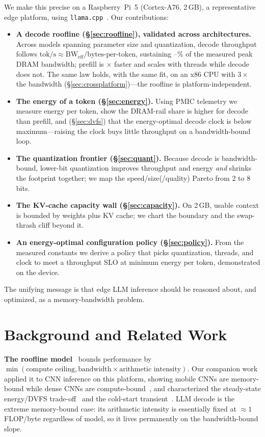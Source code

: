 \documentclass[10pt,journal,compsoc]{IEEEtran}
\newcommand{\tokps}{\text{tok/s}}
\begin{document}
We make this precise on a Raspberry~Pi~5 (Cortex-A76, 2\,GB), a representative edge platform, using
\texttt{llama.cpp}~\cite{llamacpp}. Our contributions:
\begin{itemize}
\item \textbf{A decode roofline (\S\ref{sec:roofline}), validated across architectures.} Across
models spanning parameter size and quantization, decode throughput follows
$\tokps\approx \mathrm{BW}_\text{eff}/\text{bytes-per-token}$, sustaining \DECBWLO--\DECBWHI\% of
the measured peak DRAM bandwidth; prefill is \PPTGRATIO$\times$ faster and scales with threads
while decode does not. The same law holds, with the same fit, on an x86 CPU with $3\times$ the
bandwidth (\S\ref{sec:crossplatform})---the roofline is platform-independent.
\item \textbf{The energy of a token (\S\ref{sec:energy}).} Using PMIC telemetry we measure energy
per token, show the DRAM-rail share is higher for decode than prefill, and (\S\ref{sec:dvfs}) that
the energy-optimal decode clock is below maximum---raising the clock buys little throughput on a
bandwidth-bound loop.
\item \textbf{The quantization frontier (\S\ref{sec:quant}).} Because decode is bandwidth-bound,
lower-bit quantization improves throughput and energy \emph{and} shrinks the footprint together;
we map the speed/size(/quality) Pareto from 2 to 8 bits.
\item \textbf{The KV-cache capacity wall (\S\ref{sec:capacity}).} On 2\,GB, usable context is
bounded by weights plus KV cache; we chart the boundary and the swap-thrash cliff beyond it.
\item \textbf{An energy-optimal configuration policy (\S\ref{sec:policy}).} From the measured
constants we derive a policy that picks quantization, threads, and clock to meet a throughput SLO
at minimum energy per token, demonstrated on the device.
\end{itemize}
The unifying message is that edge LLM inference should be reasoned about, and optimized, as a
memory-bandwidth problem.

\section{Background and Related Work}\label{sec:related}
\textbf{The roofline model}~\cite{williams2009roofline} bounds performance by
$\min(\text{compute ceiling}, \text{bandwidth}\times\text{arithmetic intensity})$. Our companion
work applied it to CNN inference on this platform, showing mobile CNNs are memory-bound while dense
CNNs are compute-bound~\cite{jacob2026memwall}, and characterized the steady-state energy/DVFS
trade-off~\cite{jacob2026energy} and the cold-start transient~\cite{jacob2026coldstart}. LLM decode
is the extreme memory-bound case: its arithmetic intensity is essentially fixed at $\approx 1$
FLOP/byte regardless of model, so it lives permanently on the bandwidth-bound slope.
\end{document}
